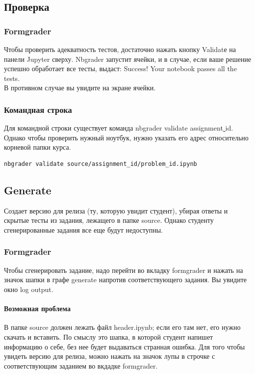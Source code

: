 \documentclass[a4paper,12pt]{article}
\begin{document}
\subsection{Проверка}
\subsubsection{Formgrader}

Чтобы проверить адекватность тестов, достаточно нажать кнопку Validatе на панели Jupyter сверху. Nbgrader запустит ячейки, и в случае, если ваше решение успешно обработает все тесты, выдаст:
\grqq Success! Your notebook passes all the tests.\grqq
\\В противном случае вы увидите на экране \grqq ячейки.
\subsubsection{Командная строка}

Для командной строки существует команда nbgrader validate assignment\underline{ }id. Однако чтобы проверить нужный ноутбук, нужно указать его адрес относительно корневой папки курса.
\begin{verbatim}
nbgrader validate source/assignment_id/problem_id.ipynb
\end{verbatim}
\subsection{Generate}

Создает версию для релиза (ту, которую увидит студент), убирая ответы и скрытые тесты из задания, лежащего в папке source. Однако студенту сгенерированные задания все еще будут недоступны.

\subsubsection{Formgrader}

Чтобы сгенерировать задание, надо перейти во вкладку formgrader и нажать на значок шапки в графе generate напротив соответствующего задания. Вы увидите окно log output.
\paragraph{Возможная проблема}
В папке source должен лежать файл header.ipynb; если его там нет, его нужно скачать и вставить. По смыслу это шапка, в которой студент напишет информацию о себе, без нее будет выдаваться странная ошибка.
Для того чтобы увидеть версию для релиза, можно нажать на значок лупы в строчке с соответствующим заданием во вкдадке formgrader.
\end{document}
